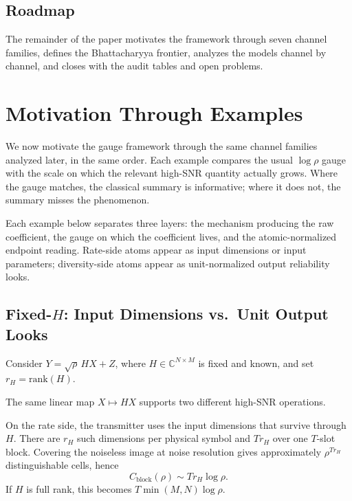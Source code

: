 \documentclass[lettersize,onecolumn]{IEEEtran}
\newcommand{\C}{\mathbb{C}}
\newcommand{\snr}{\rho}
\begin{document}
\subsection{Roadmap}

The remainder of the paper motivates the framework through seven
channel families, defines the Bhattacharyya frontier, analyzes the
models channel by channel, and closes with the audit tables and open
problems.

\section{Motivation Through Examples}\label{sec:intuition}

We now motivate the gauge framework through the same channel families
analyzed later, in the same order. Each example compares the usual
$\log\snr$ gauge with the scale on which the relevant high-SNR
quantity actually grows. Where the gauge matches, the classical
summary is informative; where it does not, the summary misses the
phenomenon.

Each example below separates three layers: the mechanism producing the
raw coefficient, the gauge on which the coefficient lives, and the
atomic-normalized endpoint reading. Rate-side atoms appear as input dimensions or input parameters;
diversity-side atoms appear as unit-normalized output reliability
looks.

\subsection{Fixed-$H$: Input Dimensions vs.\ Unit Output Looks}
\label{subsec:int_det}

Consider $Y = \sqrt{\snr}\,HX + Z$, where $H \in \C^{N\times M}$
is fixed and known, and set $r_H = \mathrm{rank}(H)$.

The same linear map $X \mapsto HX$ supports two different high-SNR
operations.

On the rate side, the transmitter uses the input dimensions that
survive through~$H$. There are $r_H$ such
dimensions per physical symbol and $Tr_H$ over one $T$-slot block.
Covering the noiseless image at noise resolution gives approximately
$\snr^{Tr_H}$ distinguishable cells, hence
\[
  C_{\mathrm{block}}(\snr) \sim Tr_H\log\snr.
\]
If $H$ is full rank, this becomes $T\min(M,N)\log\snr$.
\end{document}
